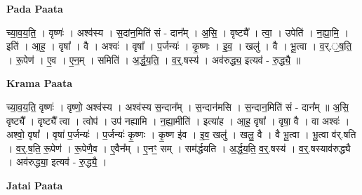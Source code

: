 \documentclass[17pt]{extarticle}
\begin{document}
\textbf{Pada Paata} \newline

च्या॒व॒य॒ति॒ । वृष्णः॑ । अश्व॑स्य । स॒दांन॒मिति॑ सं - दान᳚म् । अ॒सि॒ । वृष्ट्यै᳚ । त्वा॒ । उपेति॑ । न॒ह्या॒मि॒ । इति॑ । आ॒ह॒ । वृषा᳚ । वै । अश्वः॑ । वृषा᳚ । प॒र्जन्यः॑ । कृ॒ष्णः । इ॒व॒ । खलु॑ । वै । भू॒त्वा । व॒र्.॒ष॒ति॒ । रू॒पेण॑ । ए॒व । ए॒न॒म् । समिति॑ । अ॒र्द्ध॒य॒ति॒ । व॒र्॒.षस्य॑ । अव॑रुद्ध्य॒ इत्यव॑ - रु॒द्ध्यै॒ ॥  \newline


\textbf{Krama Paata} \newline

च्या॒व॒य॒ति॒ वृष्णः॑ । वृष्णो॒ अश्व॑स्य । अश्व॑स्य स॒न्दान᳚म् । स॒न्दान॑मसि । स॒न्दान॒मिति॑ सं - दान᳚म् ॥ अ॒सि॒ वृष्ट्यै᳚ । वृष्ट्यै᳚ त्वा । त्वोप॑ । उप॑ नह्यामि । न॒ह्या॒मीति॑ । इत्या॑ह । आ॒ह॒ वृषा᳚ । वृषा॒ वै । वा अश्वः॑ । अश्वो॒ वृषा᳚ । वृषा॑ प॒र्जन्यः॑ । प॒र्जन्यः॑ कृ॒ष्णः । कृ॒ष्ण इ॑व । इ॒व॒ खलु॑ । खलु॒ वै । वै भू॒त्वा । भू॒त्वा व॑र्.षति । व॒र्॒.ष॒ति॒ रू॒पेण॑ । रू॒पेणै॒व । ए॒वैन᳚म् । ए॒नꣳ॒॒ सम् । सम॑र्द्धयति । अ॒र्द्ध॒य॒ति॒ व॒र्॒.षस्य॑ । व॒र्॒.षस्याव॑रुद्ध्यै । अव॑रुद्ध्या॒ इत्यव॑ - रु॒द्ध्यै॒ । \newline

\textbf{Jatai Paata} \newline
\end{document}
